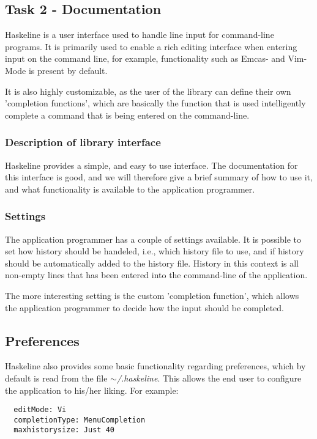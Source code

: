 \documentclass[11pt,a4paper]{article}
\begin{document}
\subsection{Task 2 - Documentation}
Haskeline is a user interface used to handle line input for command-line
programs. It is primarily used to enable a rich editing interface when entering
input on the command line, for example, functionality such as Emcas- and
Vim-Mode is present by default.

It is also highly customizable, as the user of the library can define their own
'completion functions', which are basically the function that is used
intelligently complete a command that is being entered on the command-line.

\subsubsection{Description of library interface}
Haskeline provides a simple, and easy to use interface. The documentation for
this interface is good, and we will therefore give a brief summary of how to use
it, and what functionality is available to the application programmer.

\subsubsection{Settings}
The application programmer has a couple of settings available. It is possible to
set how history should be handeled, i.e., which history file to use, and if
history should be automatically added to the history file. History in this
context is all non-empty lines that has been entered into the command-line of
the application.

The more interesting setting is the custom 'completion function', which allows
the application programmer to decide how the input should be completed.

\subsection{Preferences}
Haskeline also provides some basic functionality regarding preferences, which by
default is read from the file $\mathtt{\sim}$\textit{/.haskeline}. This allows the end user to
configure the application to his/her liking. For example:

\begin{verbatim}
  editMode: Vi
  completionType: MenuCompletion
  maxhistorysize: Just 40
\end{verbatim}
\end{document}
